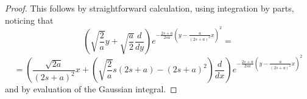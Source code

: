\documentclass[10pt,a4paper]{amsart}
\begin{document}
\begin{proof}
This follows by straightforward calculation, using integration by parts, noticing that
$$
\left(\sqrt{\frac{2}{a}}y + \sqrt{\frac{a}{2}} \frac{d}{dy}  \right) 
e^{-\frac{2s+a}{2sa}\left(y-\frac{a}{(2s+a)^2}x\right)^2} = 
$$
$$
=
\left(\frac{\sqrt{2a}}{(2s+a)^2} x + \left(\sqrt{\frac{2}{a}}s(2s+a) - (2s+a)^2\right) \frac{d}{dx}   \right) e^{-\frac{2s+a}{2sa}\left(y-\frac{a}{(2s+a)^2}x\right)^2}
 $$
 and by evaluation of the Gaussian integral.
\end{proof}
\end{document}
